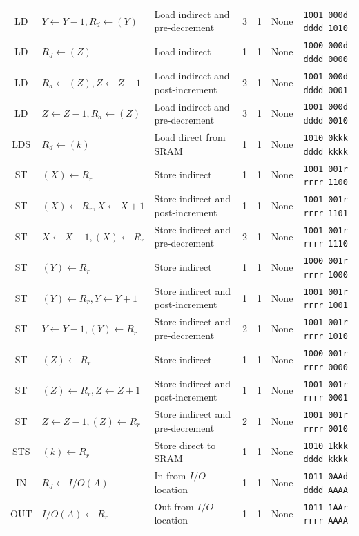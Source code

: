 \documentclass[11pt]{article}
\begin{document}
\begin{center}
\begin{longtable}{|c|m{10em}|l|c|c|c|c|}
LD & $Y \leftarrow Y - 1, R_d \leftarrow (Y)$ & Load indirect and pre-decrement & 3 & 1 & None & \texttt{1001 000d dddd 1010}\\
LD & $R_d \leftarrow (Z)$ & Load indirect & 1 & 1 & None & \texttt{1000 000d dddd 0000}\\
LD & $R_d \leftarrow (Z), Z \leftarrow Z + 1$ & Load indirect and post-increment & 2 & 1 & None & \texttt{1001 000d dddd 0001}\\
LD & $Z \leftarrow Z - 1, R_d \leftarrow (Z)$ & Load indirect and pre-decrement & 3 & 1 & None & \texttt{1001 000d dddd 0010}\\
LDS & $R_d \leftarrow (k)$ & Load direct from SRAM & 1 & 1 & None & \texttt{1010 0kkk dddd kkkk}\\
ST & $(X) \leftarrow R_r$ & Store indirect & 1 & 1 & None & \texttt{1001 001r rrrr 1100}\\
ST & $(X) \leftarrow R_r, X \leftarrow X + 1$ & Store indirect and post-increment & 1 & 1 & None & \texttt{1001 001r rrrr 1101}\\
ST & $X \leftarrow X - 1, (X) \leftarrow R_r$ & Store indirect and pre-decrement & 2 & 1 & None & \texttt{1001 001r rrrr 1110}\\
ST & $(Y) \leftarrow R_r$ & Store indirect & 1 & 1 & None & \texttt{1000 001r rrrr 1000}\\
ST & $(Y) \leftarrow R_r, Y \leftarrow Y + 1$ & Store indirect and post-increment & 1 & 1 & None & \texttt{1001 001r rrrr 1001}\\
ST & $Y \leftarrow Y - 1, (Y) \leftarrow R_r$ & Store indirect and pre-decrement & 2 & 1 & None & \texttt{1001 001r rrrr 1010}\\
ST & $(Z) \leftarrow R_r$ & Store indirect & 1 & 1 & None & \texttt{1000 001r rrrr 0000}\\
ST & $(Z) \leftarrow R_r, Z \leftarrow Z + 1$ & Store indirect and post-increment & 1 & 1 & None & \texttt{1001 001r rrrr 0001}\\
ST & $Z \leftarrow Z - 1, (Z) \leftarrow R_r$ & Store indirect and pre-decrement & 2 & 1 & None & \texttt{1001 001r rrrr 0010}\\
STS & $(k) \leftarrow R_r$ & Store direct to SRAM & 1 & 1 & None & \texttt{1010 1kkk dddd kkkk}\\
IN & $R_d \leftarrow I/O(A)$ & In from $I/O$ location & 1 & 1 & None & \texttt{1011 0AAd dddd AAAA}\\
OUT & $I/O(A) \leftarrow R_r$ & Out from $I/O$ location & 1 & 1 & None & \texttt{1011 1AAr rrrr AAAA}\\

\end{longtable}
\end{center}
\end{document}
